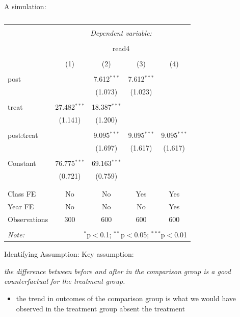 \documentclass[
  ignorenonframetext,
]{beamer}
\providecommand{\tightlist}{%
  \setlength{\itemsep}{0pt}\setlength{\parskip}{0pt}}
\begin{document}
\begin{frame}[fragile]{A simulation:}
\begin{table}[!htbp] \centering 
  \caption{} 
  \label{} 
\begin{tabular}{@{\extracolsep{5pt}}lcccc} 
\\[-1.8ex]\hline 
\hline \\[-1.8ex] 
 & \multicolumn{4}{c}{\textit{Dependent variable:}} \\ 
\cline{2-5} 
\\[-1.8ex] & \multicolumn{4}{c}{read4} \\ 
\\[-1.8ex] & (1) & (2) & (3) & (4)\\ 
\hline \\[-1.8ex] 
 post &  & 7.612$^{***}$ & 7.612$^{***}$ &  \\ 
  &  & (1.073) & (1.023) &  \\ 
  & & & & \\ 
 treat & 27.482$^{***}$ & 18.387$^{***}$ &  &  \\ 
  & (1.141) & (1.200) &  &  \\ 
  & & & & \\ 
 post:treat &  & 9.095$^{***}$ & 9.095$^{***}$ & 9.095$^{***}$ \\ 
  &  & (1.697) & (1.617) & (1.617) \\ 
  & & & & \\ 
 Constant & 76.775$^{***}$ & 69.163$^{***}$ &  &  \\ 
  & (0.721) & (0.759) &  &  \\ 
  & & & & \\ 
\hline \\[-1.8ex] 
Class FE & No & No & Yes & Yes \\ 
Year FE & No & No & No & Yes \\ 
Observations & 300 & 600 & 600 & 600 \\ 
\hline 
\hline \\[-1.8ex] 
\textit{Note:}  & \multicolumn{4}{r}{$^{*}$p$<$0.1; $^{**}$p$<$0.05; $^{***}$p$<$0.01} \\ 
\end{tabular} 
\end{table}
\end{frame}

\begin{frame}{Identifying Assumption:}
\protect\hypertarget{identifying-assumption}{}
Key assumption:

\textit{the difference between before and after in the comparison group is a good counterfactual for the treatment group.}

\begin{itemize}
\tightlist
\item
  the trend in outcomes of the comparison group is what we would have
  observed in the treatment group absent the treatment
\end{itemize}
\end{frame}
\end{document}
